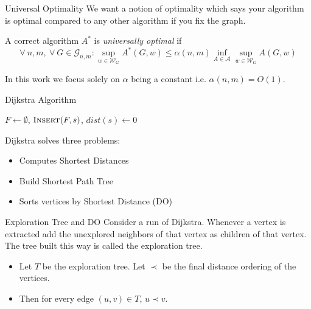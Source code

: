 \documentclass[10pt]{beamer}
\begin{document}
\begin{frame}{Universal Optimality}
	We want a notion of optimality which says your algorithm is optimal compared to any other algorithm if you fix the graph.\pause  \setlength{\parindent}{1cm}\vfill

	A correct algorithm $A^*$ is \emph{universally optimal} if$$\forall\ n,m,\ \forall\ G\in \mathcal{G}_{n,m}: \sup\limits_{w\in \mathcal{W}_G} A^*(G,w)\leq \alpha(n,m)\inf\limits_{A\in \mathcal{A}}\sup\limits_{w\in \mathcal{W}_G} A(G,w)$$\pause \vfill

	In this work we focus solely on $\alpha$ being a constant i.e. $\alpha(n,m)=O(1)$.
\end{frame}
\begin{frame}{Dijkstra Algorithm}
	\begin{algorithm}[H]
		\DontPrintSemicolon
		$F\longleftarrow \emptyset$, $\textsc{Insert}(F,s)$, 	$dist(s)\longleftarrow 0$\;
		\caption{\textsc{Dijkstra}$(G,s,w)$}
	\end{algorithm}\pause 
	Dijkstra solves three problems:
	\begin{itemize}
		\item  Computes Shortest Distances\pause 
		\item  Build Shortest Path Tree\pause 
		\item Sorts vertices by Shortest Distance (DO)
	\end{itemize}
\end{frame}
\begin{frame}{Exploration Tree and DO}
	Consider a run of Dijkstra. Whenever a vertex is extracted add the unexplored neighbors of that vertex as children of that vertex. The tree built this way is called the exploration tree.\pause \setlength{\parindent}{1cm}\vfill

	\begin{itemize}
		\item Let $T$ be the exploration tree. Let $\prec$ be the final distance ordering of the vertices.\pause \vfill
		\item Then for every edge $(u,v)\in T$, $u\prec v$.
	\end{itemize}
\end{frame}
\end{document}
